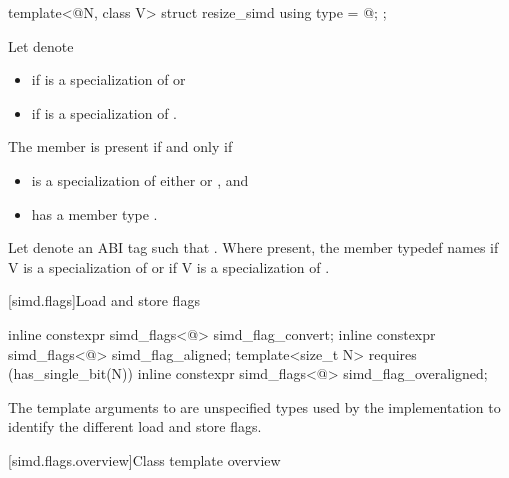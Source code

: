 \begin{itemdecl}
template<@\simdsizetype@ N, class V> struct resize_simd { using type = @\seebelow@; };
\end{itemdecl}

\begin{itemdescr}
  \pnum Let  denote
  \begin{itemize}
    \item {} if  is a specialization of
       or
    \item {} if  is a
      specialization of .
  \end{itemize}

  \pnum
  The member  is present if and only if
  \begin{itemize}
    \item {} is a specialization of either  or
      , and
    \item {} has a member type .
  \end{itemize}

  \pnum
  Let  denote an ABI tag such that .
  Where present, the member typedef  names  if \tcode V is a specialization of  or
   if \tcode V is a specialization of
  .
\end{itemdescr}

[simd.flags]{Load and store flags}

\begin{itemdecl}
inline constexpr simd_flags<@\seebelow@> simd_flag_convert{};
inline constexpr simd_flags<@\seebelow@> simd_flag_aligned{};
template<size_t N> requires (has_single_bit(N))
  inline constexpr simd_flags<@\seebelow@> simd_flag_overaligned{};
\end{itemdecl}

\begin{itemdescr}
  \pnum
  The template arguments to  are unspecified types used
  by the implementation to identify the different load and store flags.
\end{itemdescr}

[simd.flags.overview]{Class template  overview}

